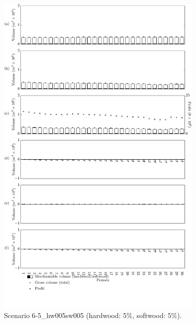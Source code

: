 \begin{figure}[h]
  \centering
  \includegraphics[width=10cm]{images/appendix/s6-1_p30a01}
  \caption{Scenario 6-5\_hw005sw005 (hardwood: 5\%, softwood: 5\%).}
  \label{fig:s6-5_hw005sw005}
\end{figure}


